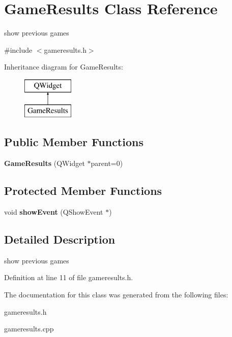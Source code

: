 \hypertarget{class_game_results}{\section{Game\-Results Class Reference}
\label{class_game_results}
}


show previous games  




{\ttfamily \#include $<$gameresults.\-h$>$}

Inheritance diagram for Game\-Results\-:\begin{figure}[H]
\begin{center}
\leavevmode
\includegraphics[height=2.000000cm]{class_game_results}
\end{center}
\end{figure}
\subsection*{Public Member Functions}
\begin{DoxyCompactItemize}
\item 
\hypertarget{class_game_results_a1d267b8278b4a65f384a29f2c194cc2c}{{\bfseries Game\-Results} (Q\-Widget $\ast$parent=0)}\label{class_game_results_a1d267b8278b4a65f384a29f2c194cc2c}

\end{DoxyCompactItemize}
\subsection*{Protected Member Functions}
\begin{DoxyCompactItemize}
\item 
\hypertarget{class_game_results_a33935ceabbb695bfdeb955b2a5167448}{void {\bfseries show\-Event} (Q\-Show\-Event $\ast$)}\label{class_game_results_a33935ceabbb695bfdeb955b2a5167448}

\end{DoxyCompactItemize}


\subsection{Detailed Description}
show previous games 

Definition at line 11 of file gameresults.\-h.



The documentation for this class was generated from the following files\-:\begin{DoxyCompactItemize}
\item 
gameresults.\-h\item 
gameresults.\-cpp\end{DoxyCompactItemize}
